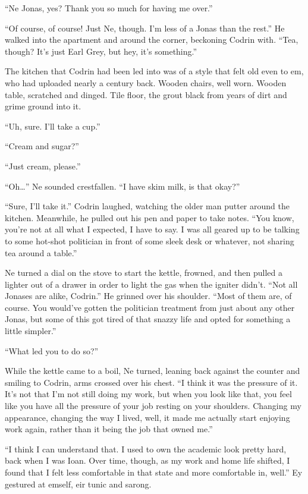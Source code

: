 ``Ne Jonas, yes? Thank you so much for having me over.''

``Of course, of course! Just Ne, though. I'm less of a Jonas than the rest.'' He walked into the apartment and around the corner, beckoning Codrin with. ``Tea, though? It's just Earl Grey, but hey, it's something.''

The kitchen that Codrin had been led into was of a style that felt old even to em, who had uploaded nearly a century back. Wooden chairs, well worn. Wooden table, scratched and dinged. Tile floor, the grout black from years of dirt and grime ground into it.

``Uh, sure. I'll take a cup.''

``Cream and sugar?''

``Just cream, please.''

``Oh\ldots{}'' Ne sounded crestfallen. ``I have skim milk, is that okay?''

``Sure, I'll take it.'' Codrin laughed, watching the older man putter around the kitchen. Meanwhile, he pulled out his pen and paper to take notes. ``You know, you're not at all what I expected, I have to say. I was all geared up to be talking to some hot-shot politician in front of some sleek desk or whatever, not sharing tea around a table.''

Ne turned a dial on the stove to start the kettle, frowned, and then pulled a lighter out of a drawer in order to light the gas when the igniter didn't. ``Not all Jonases are alike, Codrin.'' He grinned over his shoulder. ``Most of them are, of course. You would've gotten the politician treatment from just about any other Jonas, but some of this got tired of that snazzy life and opted for something a little simpler.''

``What led you to do so?''

While the kettle came to a boil, Ne turned, leaning back against the counter and smiling to Codrin, arms crossed over his chest. ``I think it was the pressure of it. It's not that I'm not still doing my work, but when you look like that, you feel like you have all the pressure of your job resting on your shoulders. Changing my appearance, changing the way I lived, well, it made me actually start enjoying work again, rather than it being the job that owned me.''

``I think I can understand that. I used to own the academic look pretty hard, back when I was Ioan. Over time, though, as my work and home life shifted, I found that I felt less comfortable in that state and more comfortable in, well.'' Ey gestured at emself, eir tunic and sarong.

